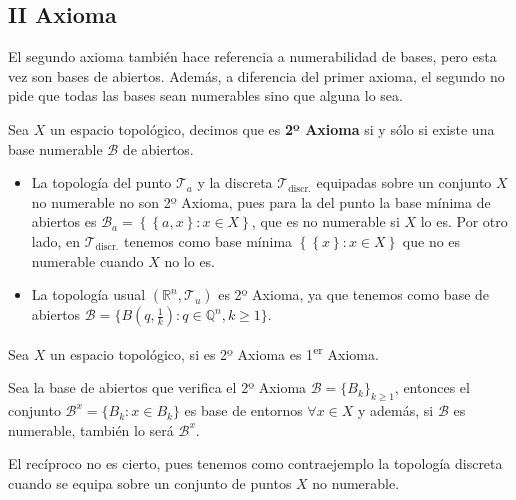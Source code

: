 \subsection{II Axioma}%
\label{sub:iiax}
El segundo axioma también hace referencia a numerabilidad de bases, pero esta vez son bases de abiertos. Además, a diferencia del primer axioma, el segundo no pide que todas las bases sean numerables sino que alguna lo sea.

\begin{defi}[2º Axioma]
Sea $X$ un espacio topológico, decimos que es \textbf{2º Axioma} si y sólo si existe una base numerable $\mathcal{B}$ de abiertos.
\end{defi}

\begin{ej}
\begin{itemize}
    \item La topología del punto $\mathcal{T}_a$ y la discreta $\mathcal{T}_{\text{discr.}}$ equipadas sobre un conjunto $X$ no numerable no son 2º Axioma, pues para la del punto la base mínima de abiertos es $\mathcal{B}_a = \left\{ \left\{ a, x \right\}: x \in X \right\}$, que es no numerable si $X$ lo es. Por otro lado, en $\mathcal{T}_{\text{discr.}}$ tenemos como base mínima $\left\{ \left\{ x \right\}: x \in X \right\}$ que no es numerable cuando $X$ no lo es.
    \item La topología usual $\left( \mathbb{R}^n, \mathcal{T}_{u} \right)$ es 2º Axioma, ya que tenemos como base de abiertos $\mathcal{B} = \{B \left( q, \frac{1}{k}\right) : q \in \mathbb{Q}^n, k \ge 1 \}$.
\end{itemize}
\end{ej}

\begin{prop}
Sea $X$ un espacio topológico, si es 2º Axioma es 1\textsuperscript{er} Axioma.
\end{prop}
\begin{demo}
Sea la base de abiertos que verifica el 2º Axioma $\mathcal{B} = \{B_k\}_{k \ge 1}$, entonces el conjunto $\mathcal{B}^x = \{B_k : x \in B_k\}$ es base de entornos $\forall x \in X$ y además, si $\mathcal{B}$ es numerable, también lo será $\mathcal{B}^x$.
\end{demo}

\begin{obs}
El recíproco no es cierto, pues tenemos como contraejemplo la topología discreta cuando se equipa sobre un conjunto de puntos $X$ no numerable.
\end{obs}

